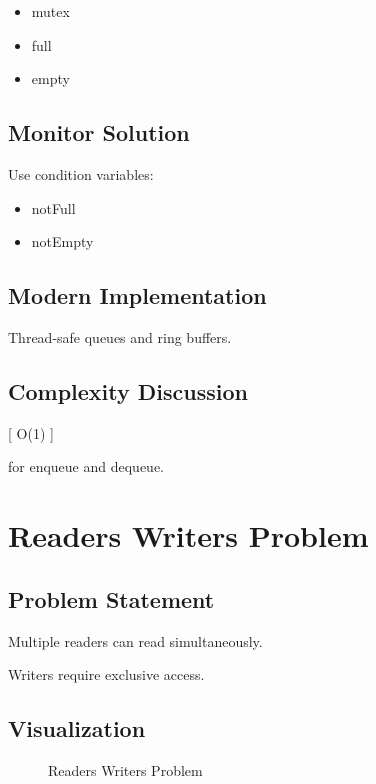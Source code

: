 \begin{itemize}
\item mutex
\item full
\item empty
\end{itemize}

\subsection{Monitor Solution}

Use condition variables:

\begin{itemize}
\item notFull
\item notEmpty
\end{itemize}

\subsection{Modern Implementation}

Thread-safe queues and ring buffers.

\subsection{Complexity Discussion}

[
O(1)
]

for enqueue and dequeue.

\section{Readers Writers Problem}

\subsection{Problem Statement}

Multiple readers can read simultaneously.

Writers require exclusive access.

\subsection{Visualization}

\begin{figure}[H]
\centering
{}
\caption{Readers Writers Problem}
\end{figure}

